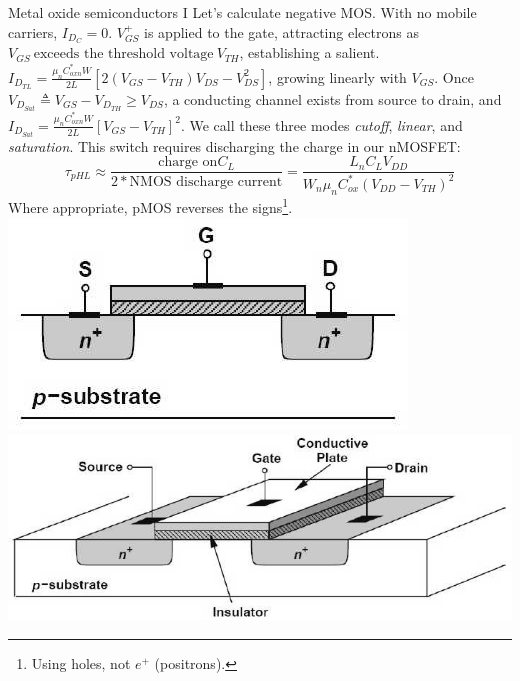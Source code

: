 \documentclass[mathserif,xcolor={dvipsnames,table}]{beamer}
\begin{document}
\begin{frame}{Metal oxide semiconductors I}
\scriptsize{Let's calculate negative MOS. With no
mobile carriers, $I_{D_{C}} = 0$. $V^{+}_{GS}$
is applied to the gate, attracting electrons as $V_{GS}\ \text{exceeds the threshold
voltage}\ V_{TH}$, establishing a salient.
$I_{D_{TL}} = \frac{\mu_{n}C^{*}_{oxn}W}{2L}\left[2(V_{GS} - V_{TH})V_{DS} - V^{2}_{DS}\right]$, growing
linearly with $V_{GS}$. Once $V_{D_{Sat}}\triangleq V_{GS} - V_{D_{TH}} \ge V_{DS}$, a
conducting channel exists from source to drain, and $I_{D_{Sat}} = \frac{\mu_{n}C^{*}_{oxn}W}{2L}\left[V_{GS} - V_{TH}\right]^{2}$. We call these three modes \textit{cutoff},
\textit{linear}, and \textit{saturation}. This switch requires discharging the charge in our nMOSFET:\\
\begin{equation}
\tau_{pHL} \approx \frac{\text{charge on} C_L}{2 * \text{NMOS discharge current}} = \frac{L_{n}C_{L}V_{DD}}{W_{n}\mu_{n}C^{*}_{ox}\left(V_{DD} - V_{TH}\right)^{2}}
\end{equation}
Where appropriate, pMOS reverses the signs\footnote{Using holes, not $e^{+}$ (positrons).}.
}
\vfill
\includegraphics[scale=.3]{images/oe-001.png}
\includegraphics[scale=.3]{images/oe-000.png}
\end{frame}
\end{document}
